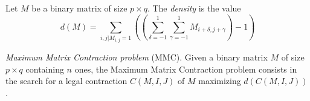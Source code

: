 \begin{definition}
	Let $M$ be a binary matrix of size $p \times q$. The \emph{density} is the value
	$$ 
	d(M) = \sum\limits_{i,j | M_{i,j} = 1} \left(\left(\sum\limits_{\delta = -1}^1 \sum\limits_{\gamma = -1}^1  M_{i+\delta,j+\gamma}\right) - 1 \right)
	$$
\end{definition}

\begin{problem}
	\emph{Maximum Matrix Contraction problem} (MMC). Given a binary matrix $M$ of size $p \times q$ containing $n$ ones, the Maximum Matrix Contraction problem consists in the search for a legal contraction $C(M,I,J)$ of $M$ maximizing $d(C(M,I,J))$.
\end{problem}

\begin{comment}
Doit-on parler du programme mathématique trivial ici?
\end{comment}


